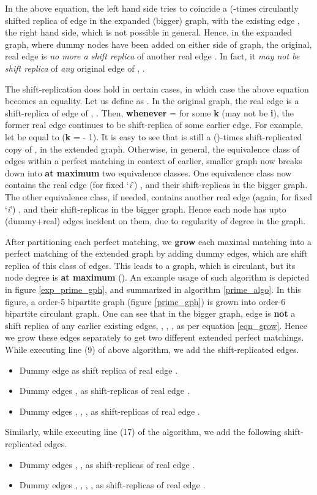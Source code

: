 \documentclass[12pt]{article}
\begin{document}
In the above equation, the left hand side tries to coincide a
(-times circulantly shifted replica of edge  in the expanded (bigger) graph, with the
existing edge , the right hand side, which is not possible in general. Hence, in the expanded graph, where 
dummy nodes have been added on either side of graph, the original, real
edge 
is \textit{no more a shift replica} of another real edge . In fact, it \textit{may not
be shift replica} of \textit{any} original edge of
, .

The shift-replication does hold in certain cases, in which case the
above equation becomes an equality. Let us define  as . In the original graph, the real edge
 is a
shift-replica of  edge of , . Then,
\textbf{whenever}  =  for some
\textbf{k} (may not be \textbf{i}), the former real edge continues to be
shift-replica of some earlier edge. For example, let 
be equal to  (\textbf{k} =  - 1). It is
easy to see that  is still a ()-times
shift-replicated copy of , in the extended graph.
Otherwise, in general, the equivalence class of edges within a
perfect matching in context of earlier, smaller graph now breaks
down into \textbf{at maximum} two equivalence
classes. One equivalence class now contains the real edge (for fixed
`\textit{i}') , and their
shift-replicas in the bigger graph. The other equivalence class,
if needed, contains
another real edge (again, for fixed `\textit{i}') , and their shift-replicas in the bigger
graph. Hence each node has upto  (dummy+real) edges
incident on them, due to regularity of degree in the graph.

After partitioning each perfect matching, we \textbf{grow} each maximal
matching into a perfect matching of the extended graph by adding dummy
edges, which are shift replica of this class of edges. This leads to a
graph, which is circulant, but its node degree is \textbf{at maximum}
(). An example usage of such algorithm is depicted in figure
\ref{exp_prime_gph}, and summarized in algorithm \ref{prime_algo}. In this
figure, a order-5 bipartite graph (figure \ref{prime_gph}) is grown into
order-6 bipartite circulant graph. One can see that in the bigger
graph, edge  is \textbf{not} a shift replica of
any earlier existing edges, , , , as per equation
\ref{eqn_grow}. Hence we grow these edges separately to get two different
extended perfect matchings. While executing line (9) of above algorithm,
we add the shift-replicated edges.
\begin{itemize}
\item Dummy edge  as shift replica of real edge .
\item Dummy edges ,  as
        shift-replicas of real edge .
\item Dummy edges , ,
        ,  as
        shift-replicas of real edge .
\end{itemize}
Similarly, while executing line (17) of the algorithm, we add the following
shift-replicated edges.
\begin{itemize}
\item Dummy edges , ,
         as shift-replicas of real edge .
\item Dummy edges , ,
        , ,  as shift-replicas of
        real edge .
\end{itemize}
\end{document}
